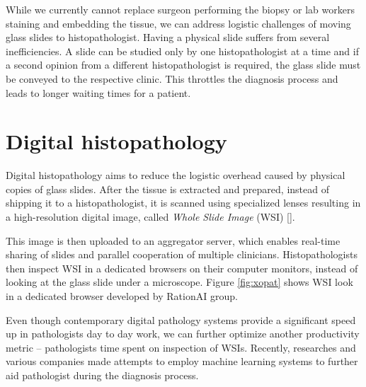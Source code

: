 While we currently cannot replace surgeon performing the biopsy or lab workers staining and embedding the tissue, we can address logistic challenges of moving glass slides to histopathologist.
Having a physical slide suffers from several inefficiencies. 
A slide can be studied only by one histopathologist at a time and if a second opinion from a different histopathologist is required, the glass slide must be conveyed to the respective clinic.
This throttles the diagnosis process and leads to longer waiting times for a patient.

\section{Digital histopathology}

Digital histopathology aims to reduce the logistic overhead caused by physical copies of glass slides.
After the tissue is extracted and prepared, instead of shipping it to a histopathologist, it is scanned using specialized lenses resulting in a high-resolution digital image, called \emph{Whole Slide Image} (WSI) [].

This image is then uploaded to an aggregator server, which enables real-time sharing of slides and parallel cooperation of multiple clinicians.
Histopathologists then inspect WSI in a dedicated browsers on their computer monitors, instead of looking at the glass slide under a microscope. Figure \ref{fig:xopat} shows WSI look in a dedicated browser developed by RationAI group.

Even though contemporary digital pathology systems provide a significant speed up in pathologists day to day work, we can further optimize another productivity metric – pathologists time spent on inspection of WSIs.
Recently, researches and various companies made attempts to employ machine learning systems to further aid pathologist during the diagnosis process. 

